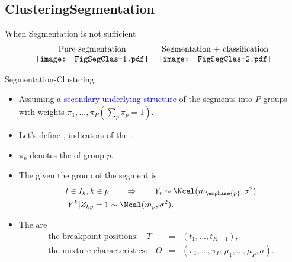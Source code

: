 \subsection*{ClusteringSegmentation}
\begin{frame}{When Segmentation is not sufficient}
$$
\begin{tabular}{cc}
  Pure segmentation & Segmentation + classification \\
  \texttt{[image: FigSegClas-1.pdf]} &
  \texttt{[image: FigSegClas-2.pdf]} 
  \end{tabular}
$$
\end{frame}
\begin{frame}{Segmentation-Clustering}
 \begin{itemize}
 \item Assuming a \textcolor{blue}{secondary underlying
     structure} of the segments into $P$ groups with weights
   $\pi_1,...,\pi_P (\sum_p \pi_p=1)$.
 \item Let's define , indicators of the
   .
 \item $\pi_p$ denotes the  of group $p$.
 \item The  given the group of the
     segment is
  \begin{align*}
   t \in I_k, k \in p &\qquad \Rightarrow \qquad Y_t \sim
   \Ncal(m_{\emphase{p}}, \sigma^2)\\
   Y^k|Z_{kp}=1 &\sim \Ncal( m_p, \sigma^2 ).
   \end{align*}
 \item The  are
   \begin{eqnarray*}
   \mbox{the breakpoint positions:} \quad T&=&(t_1, ..., t_{K-1}),\\
     \mbox{the mixture characteristics:} \quad \Theta&=&(\pi_1,\hdots,\pi_P;\mu_1,\hdots,\mu_P,\sigma).
   \end{eqnarray*}
\end{itemize}
\end{frame} 


